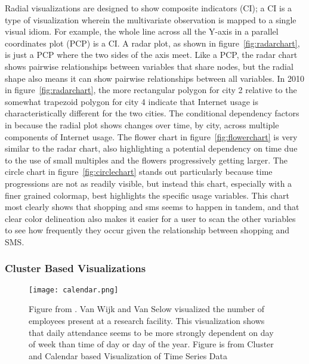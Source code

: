 \documentclass[../main.tex]{subfiles}
\begin{document}
Radial visualizations are designed to show composite indicators (CI)\cite{chambers_graphical_1983}; a CI is a type of visualization wherein the multivariate observation is  mapped to a single visual idiom. For example, the whole line across all the Y-axis in a parallel coordinates plot (PCP) is a CI. A radar plot, as shown in figure~\ref{fig:radarchart}, is just a PCP where the two sides of the axis meet. Like a PCP, the radar chart shows pairwise relationships between variables that share nodes, but the radial shape also means it can show pairwise relationships between all variables. In 2010 in figure~\ref{fig:radarchart}, the more rectangular polygon for city 2 relative to the somewhat trapezoid polygon for city 4 indicate that Internet usage is characteristically different for the two cities. The conditional dependency factors in because the radial plot shows changes over time, by city, across multiple components of Internet usage. The flower chart in figure~\ref{fig:flowerchart} is very similar to the radar chart, also highlighting a potential dependency on time due to the use of small multiples and the flowers progressively getting larger. The circle chart in figure~\ref{fig:circlechart} stands out particularly because time progressions are not as readily visible, but instead this chart, especially with a finer grained colormap, best highlights the specific usage variables. This chart most clearly shows that shopping and sms seems to happen in tandem, and that clear color delineation also makes it easier for a user to scan the other variables to see how frequently they occur given the relationship between shopping and SMS. 

\subsubsection{Cluster Based Visualizations}
\begin{figure}
\texttt{[image: calendar.png]}
\caption{Figure from \cite{van_wijk_cluster_1999}. Van Wijk and Van Selow visualized the number of employees present at a research facility. This visualization shows that daily attendance seems to be more strongly dependent on day of week than time of day or day of the year. Figure is from Cluster and Calendar based Visualization of Time Series Data \cite{van_wijk_cluster_1999}}
\label{fig:calendar}
\end{figure}
\end{document}
